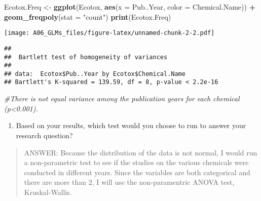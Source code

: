 \documentclass[]{article}
\newenvironment{Shaded}{\begin{snugshade}}{\end{snugshade}}
\newcommand{\KeywordTok}[1]{\textcolor[rgb]{0.13,0.29,0.53}{\textbf{#1}}}
\newcommand{\DataTypeTok}[1]{\textcolor[rgb]{0.13,0.29,0.53}{#1}}
\newcommand{\StringTok}[1]{\textcolor[rgb]{0.31,0.60,0.02}{#1}}
\newcommand{\CommentTok}[1]{\textcolor[rgb]{0.56,0.35,0.01}{\textit{#1}}}
\newcommand{\OperatorTok}[1]{\textcolor[rgb]{0.81,0.36,0.00}{\textbf{#1}}}
\newcommand{\NormalTok}[1]{#1}
\providecommand{\tightlist}{%
  \setlength{\itemsep}{0pt}\setlength{\parskip}{0pt}}
\begin{document}
\begin{Shaded}
\begin{Highlighting}[]
\NormalTok{Ecotox.Freq <-}\StringTok{ }\KeywordTok{ggplot}\NormalTok{(Ecotox, }\KeywordTok{aes}\NormalTok{(}\DataTypeTok{x =}\NormalTok{ Pub..Year, }\DataTypeTok{color =}\NormalTok{ Chemical.Name)) }\OperatorTok{+}
\StringTok{  }\KeywordTok{geom_freqpoly}\NormalTok{(}\DataTypeTok{stat =} \StringTok{"count"}\NormalTok{)}
\KeywordTok{print}\NormalTok{(Ecotox.Freq)}
\end{Highlighting}
\end{Shaded}

\texttt{[image: A06\_GLMs\_files/figure-latex/unnamed-chunk-2-2.pdf]}

\begin{Shaded}
\end{Shaded}

\begin{verbatim}
## 
##  Bartlett test of homogeneity of variances
## 
## data:  Ecotox$Pub..Year by Ecotox$Chemical.Name
## Bartlett's K-squared = 139.59, df = 8, p-value < 2.2e-16
\end{verbatim}

\begin{Shaded}
\begin{Highlighting}[]
\CommentTok{#There is not equal variance among the publication years for each chemical (p<0.001).}
\end{Highlighting}
\end{Shaded}

\begin{enumerate}
\def\labelenumi{\arabic{enumi}.}
\setcounter{enumi}{5}
\tightlist
\item
  Based on your results, which test would you choose to run to answer
  your research question?
\end{enumerate}

\begin{quote}
ANSWER: Because the distribution of the data is not normal, I would run
a non-parametric test to see if the studies on the various chemicals
were conducted in different years. Since the variables are both
categorical and there are more than 2, I will use the non-paramentric
ANOVA test, Kruskal-Wallis.
\end{quote}
\end{document}
